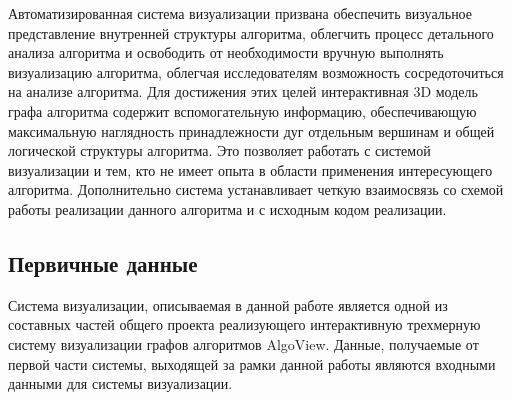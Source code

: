 Автоматизированная система визуализации призвана обеспечить визуальное представление внутренней структуры алгоритма, облегчить процесс детального анализа алгоритма и освободить от необходимости вручную выполнять визуализацию алгоритма, облегчая исследователям возможность сосредоточиться на анализе алгоритма. Для достижения этих целей интерактивная 3D модель графа алгоритма содержит вспомогательную информацию, обеспечивающую максимальную наглядность принадлежности дуг отдельным вершинам и общей логической структуры алгоритма. Это позволяет работать с системой визуализации и тем, кто не имеет опыта в области применения интересующего алгоритма. Дополнительно система устанавливает четкую взаимосвязь со схемой работы реализации данного алгоритма и с исходным кодом реализации.

\subsection{Первичные данные}

Система визуализации, описываемая в данной работе является одной из составных частей общего проекта реализующего интерактивную трехмерную систему визуализации графов алгоритмов AlgoView. Данные, получаемые от первой части системы, выходящей за рамки данной работы являются входными данными для системы визуализации.
